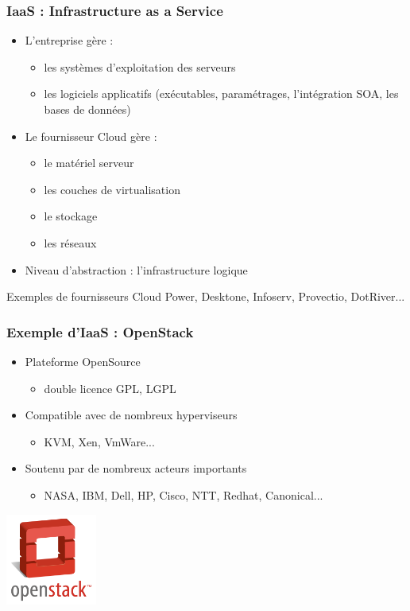 \begin{frame}
\frametitle{IaaS : Infrastructure as a Service}
\begin{itemize}
\item L'entreprise gère : 
\begin{itemize}
\item les systèmes d'exploitation des serveurs
\item les logiciels applicatifs (exécutables, paramétrages, l'intégration SOA, les bases de données)
\end{itemize}
\item Le fournisseur Cloud gère :
\begin{itemize}
\item le matériel serveur
\item les couches de virtualisation
\item le stockage
\item les réseaux
\end{itemize}
\item Niveau d'abstraction : l'infrastructure logique
\end{itemize}
\begin{exampleblock}{Exemples de fournisseurs}
Cloud Power, Desktone, Infoserv, Provectio, DotRiver...
\end{exampleblock}
\end{frame}

\begin{frame}
  \frametitle{Exemple d'IaaS : OpenStack}
  \begin{itemize}
  \item Plateforme OpenSource
  \begin{itemize}
    \item double licence GPL, LGPL
  \end{itemize}

  \item Compatible avec de nombreux hyperviseurs
  \begin{itemize}
    \item KVM, Xen, VmWare...
  \end{itemize}

  \item Soutenu par de nombreux acteurs importants
  \begin{itemize}
  \item NASA, IBM, Dell, HP, Cisco, NTT, Redhat, Canonical...
  \end{itemize}
  \end{itemize}
  \includegraphics[height=3cm]{../illustration/logo-openstack.png}       
\end{frame}

